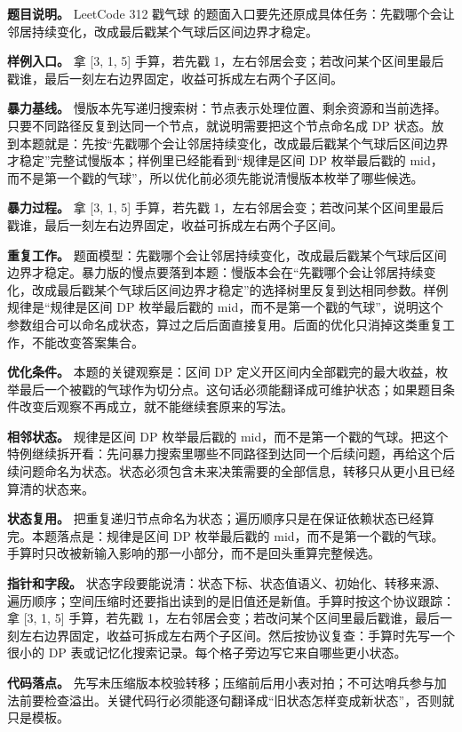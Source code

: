 \textbf{题目说明。} LeetCode 312 戳气球 的题面入口要先还原成具体任务：先戳哪个会让邻居持续变化，改成最后戳某个气球后区间边界才稳定。

\textbf{样例入口。} 拿 [3, 1, 5] 手算，若先戳 1，左右邻居会变；若改问某个区间里最后戳谁，最后一刻左右边界固定，收益可拆成左右两个子区间。

\textbf{暴力基线。} 慢版本先写递归搜索树：节点表示处理位置、剩余资源和当前选择。只要不同路径反复到达同一个节点，就说明需要把这个节点命名成 DP 状态。放到本题就是：先按“先戳哪个会让邻居持续变化，改成最后戳某个气球后区间边界才稳定”完整试慢版本；样例里已经能看到“规律是区间 DP 枚举最后戳的 mid，而不是第一个戳的气球”，所以优化前必须先能说清慢版本枚举了哪些候选。

\textbf{暴力过程。} 拿 [3, 1, 5] 手算，若先戳 1，左右邻居会变；若改问某个区间里最后戳谁，最后一刻左右边界固定，收益可拆成左右两个子区间。

\textbf{重复工作。} 题面模型：先戳哪个会让邻居持续变化，改成最后戳某个气球后区间边界才稳定。暴力版的慢点要落到本题：慢版本会在“先戳哪个会让邻居持续变化，改成最后戳某个气球后区间边界才稳定”的选择树里反复到达相同参数。样例规律是“规律是区间 DP 枚举最后戳的 mid，而不是第一个戳的气球”，说明这个参数组合可以命名成状态，算过之后后面直接复用。后面的优化只消掉这类重复工作，不能改变答案集合。

\textbf{优化条件。} 本题的关键观察是：区间 DP 定义开区间内全部戳完的最大收益，枚举最后一个被戳的气球作为切分点。这句话必须能翻译成可维护状态；如果题目条件改变后观察不再成立，就不能继续套原来的写法。

\textbf{相邻状态。} 规律是区间 DP 枚举最后戳的 mid，而不是第一个戳的气球。把这个特例继续拆开看：先问暴力搜索里哪些不同路径到达同一个后续问题，再给这个后续问题命名为状态。状态必须包含未来决策需要的全部信息，转移只从更小且已经算清的状态来。

\textbf{状态复用。} 把重复递归节点命名为状态；遍历顺序只是在保证依赖状态已经算完。本题落点是：规律是区间 DP 枚举最后戳的 mid，而不是第一个戳的气球。手算时只改被新输入影响的那一小部分，而不是回头重算完整候选。

\textbf{指针和字段。} 状态字段要能说清：状态下标、状态值语义、初始化、转移来源、遍历顺序；空间压缩时还要指出读到的是旧值还是新值。手算时按这个协议跟踪：拿 [3, 1, 5] 手算，若先戳 1，左右邻居会变；若改问某个区间里最后戳谁，最后一刻左右边界固定，收益可拆成左右两个子区间。然后按协议复查：手算时先写一个很小的 DP 表或记忆化搜索记录。每个格子旁边写它来自哪些更小状态。

\textbf{代码落点。} 先写未压缩版本校验转移；压缩前后用小表对拍；不可达哨兵参与加法前要检查溢出。关键代码行必须能逐句翻译成“旧状态怎样变成新状态”，否则就只是模板。

